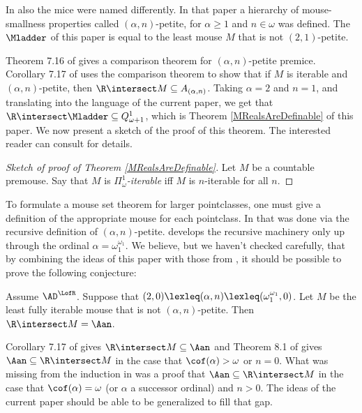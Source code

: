 \documentclass[oneside,12pt]{amsart}
\begin{document}
In \cite{Mouse_Sets} also the mice were named differently. In that paper
a hierarchy of mouse-smallness properties called $(\alpha,n)$-petite, for $\alpha\geq 1$
and $n\in\omega$ was defined. The $\Mladder$ of this paper is equal to the least mouse
$M$ that is not $(2,1)$-petite.

Theorem 7.16 of \cite{Mouse_Sets} gives a comparison theorem for
$(\alpha,n)$-petite premice.  Corollary 7.17 of \cite{Mouse_Sets} uses the comparison
theorem to show that if $M$ is iterable and $(\alpha,n)$-petite, then
$\R\intersect M \subseteq A_{(\alpha,n)}$. Taking $\alpha=2$ and $n=1$, and translating into the language of the current paper, we get that
$\R\intersect \Mladder \subseteq Q^1_{\omega+1}$, which is Theorem \ref{MRealsAreDefinable} of this paper. We now present a sketch of the proof of this theorem.
The interested reader can consult \cite{Mouse_Sets} for details.

\begin{proof}[Sketch of proof of Theorem \ref{MRealsAreDefinable}]
Let $M$ be a countable premouse. Say that $M$ is \emph{$\Pi^1_{\omega}$-iterable}
iff $M$ is $n$-iterable for all $n$.
\end{proof}

To formulate a mouse set theorem for larger pointclasses, one must give a definition
of the appropriate mouse for each pointclass. In \cite{Mouse_Sets} that was done
via the recursive definition of $(\alpha,n)$-petite.  \cite{Mouse_Sets} develops
the recursive machinery only up through the ordinal $\alpha=\omega_1^{\omega_1}$.
We believe, but we haven't checked carefully, that by combining the ideas of
this paper with those from
\cite{Mouse_Sets}, it should be possible to prove the following conjecture:

\begin{conjecture}
\label{PetiteIsRight}
Assume $\AD^{\LofR}$. Suppose that
$(2,0) \lexleq (\alpha,n) \lexleq (\omega_1^{\omega_1}, 0)$.
Let $M$ be the least fully iterable mouse that is not $(\alpha, n)$-petite.
Then $\R\intersect M = \Aan$.
\end{conjecture}

Corollary 7.17 of \cite{Mouse_Sets} gives $\R\intersect M \subseteq \Aan$
and Theorem 8.1 of \cite{Mouse_Sets} gives $\Aan \subseteq \R\intersect M$
in the case that $\cof(\alpha)>\omega$ or $n=0$. What was missing from the
induction in \cite{Mouse_Sets} was a proof that $\Aan\subseteq \R \intersect M$
in the case that $\cof(\alpha)=\omega$ (or $\alpha$ a successor ordinal) and $n>0$.
The ideas of the current paper
should be able to be generalized to fill that gap.
\end{document}

